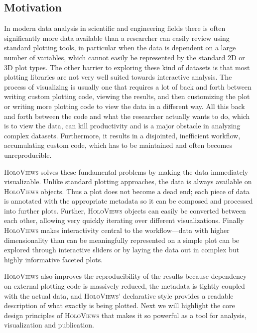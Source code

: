 \subsection{Motivation}

In modern data analysis in scientific and engineering fields there is
often significantly more data available than a researcher can easily
review using standard plotting tools, in particular when the data is
dependent on a large number of variables, which cannot easily be
represented by the standard 2D or 3D plot types. The other barrier to
exploring these kind of datasets is that most plotting libraries are
not very well suited towards interactive analysis. The process of
visualizing is usually one that requires a lot of back and forth
between writing custom plotting code, viewing the results, and then
customizing the plot or writing more plotting code to view the data in
a different way. All this back and forth between the code and what the
researcher actually wants to do, which is to view the data, can kill
productivity and is a major obstacle in analyzing complex
datasets. Furthermore, it results in a disjointed, inefficient
workflow, accumulating custom code, which has to be maintained and
often becomes unreproducible.

\textsc{HoloViews} solves these fundamental problems by making the
data immediately visualizable. Unlike standard plotting approaches,
the data is always available on \textsc{HoloViews} objects. Thus a
plot does not become a dead end; each piece of data is annotated with
the appropriate metadata so it can be composed and processed into
further plots. Further, \textsc{HoloViews} objects can easily be
converted between each other, allowing very quickly iterating over
different visualizations. Finally \textsc{HoloViews} makes
interactivity central to the workflow---data with higher
dimensionality than can be meaningfully represented on a simple plot
can be explored through interactive sliders or by laying the data out
in complex but highly informative faceted plots.

\textsc{HoloViews} also improves the reproducibility of the results
because dependency on external plotting code is massively reduced, the
metadata is tightly coupled with the actual data, and
\textsc{HoloViews}' declarative style provides a readable description
of what exactly is being plotted. Next we will highlight the core
design principles of \textsc{HoloViews} that makes it so powerful as a
tool for analysis, visualization and publication.

